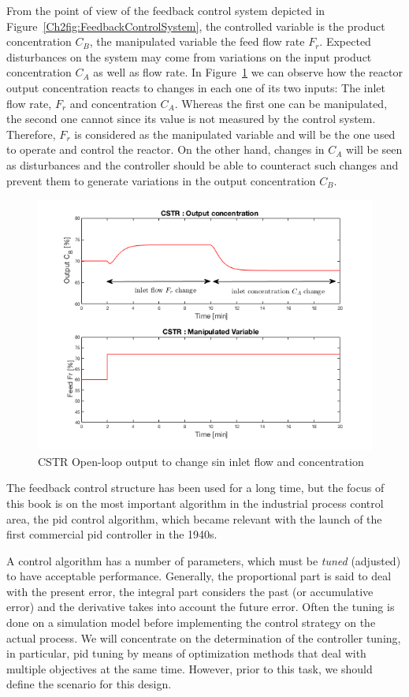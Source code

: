 From the point of view of the feedback control system depicted in Figure~\ref{Ch2fig:FeedbackControlSystem}, the controlled variable is the product concentration $C_B$, the manipulated variable  the feed flow rate $F_r$. Expected disturbances on the system  may come from variations on the input product concentration $C_A$ as well as flow rate. In Figure~\ref{Ch2fig:CSTRFigureOpenLoop} we can observe how the reactor output concentration reacts to changes in each one of its two inputs: The inlet flow rate, $F_r$ and concentration $C_A$. Whereas the first one can be manipulated, the second one cannot since its value is not measured by the control system. Therefore, $F_r$ is considered as the manipulated variable and will be the one used to operate and control the reactor. On the other hand, changes in $C_A$ will be seen as disturbances and the controller should be able to counteract such changes and prevent them to generate variations in the output concentration $C_B$. 
%
\begin{figure}[tb]
\centering
\includegraphics[width=\linewidth]{../figuras/Ch2FigureOpenLoop}
\caption{CSTR Open-loop output to change sin inlet flow and concentration} 
\label{Ch2fig:CSTRFigureOpenLoop}
\end{figure}

The feedback control structure has been used for a long time, but the focus of this book is on the most important algorithm in the industrial process control area, the \gls{pid} control algorithm, which became relevant with the launch of the first commercial \gls{pid} controller in the 1940s.

A control algorithm has a number of parameters, which must be \emph{tuned} (adjusted) to have acceptable performance. Generally, the proportional part is said to deal with the present error, the integral part considers the past (or accumulative error) and the derivative takes into account the future error. Often the tuning is done on a simulation model before implementing the control strategy on the actual process. We will concentrate on the determination of the controller tuning, in particular, \gls{pid} tuning by means of optimization methods that deal with multiple objectives at the same time. However, prior to this task, we should define the scenario for this design.

